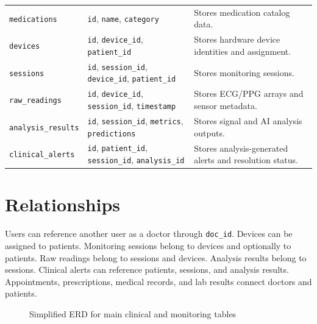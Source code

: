 \begin{longtable}{p{} p{} p{}}
\texttt{medications} & \texttt{id}, \texttt{name}, \texttt{category} & Stores medication catalog data.\\
\texttt{devices} & \texttt{id}, \texttt{device\_id}, \texttt{patient\_id} & Stores hardware device identities and assignment.\\
\texttt{sessions} & \texttt{id}, \texttt{session\_id}, \texttt{device\_id}, \texttt{patient\_id} & Stores monitoring sessions.\\
\texttt{raw\_readings} & \texttt{id}, \texttt{device\_id}, \texttt{session\_id}, \texttt{timestamp} & Stores ECG/PPG arrays and sensor metadata.\\
\texttt{analysis\_results} & \texttt{id}, \texttt{session\_id}, \texttt{metrics}, \texttt{predictions} & Stores signal and AI analysis outputs.\\
\texttt{clinical\_alerts} & \texttt{id}, \texttt{patient\_id}, \texttt{session\_id}, \texttt{analysis\_id} & Stores analysis-generated alerts and resolution status.\\
\bottomrule
\end{longtable}

\section{Relationships}

Users can reference another user as a doctor through \texttt{doc\_id}. Devices can be assigned to patients. Monitoring sessions belong to devices and optionally to patients. Raw readings belong to sessions and devices. Analysis results belong to sessions. Clinical alerts can reference patients, sessions, and analysis results. Appointments, prescriptions, medical records, and lab results connect doctors and patients.

\begin{figure}[H]
\centering
{}
\caption{Simplified ERD for main clinical and monitoring tables}
\label{fig:erd}
\end{figure}


